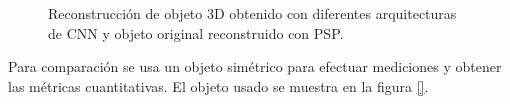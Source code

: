 \documentclass[10pt,letterpaper]{article}
\begin{document}
\begin{figure}[H]
\begin{center}
{            \label{tif140}}
        \caption{Reconstrucción de objeto 3D obtenido con diferentes arquitecturas de CNN y objeto original reconstruido con PSP.}
        \label{tif13713813914094}
      \end{center}
\end{figure}

Para comparación se usa un objeto simétrico para efectuar mediciones y obtener las métricas cuantitativas. El objeto usado se muestra en la figura \ref{}.
\end{document}
